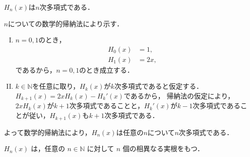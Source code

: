 \begin{proposition}{}{}
    $H_n (x)$は$n$次多項式である．
\end{proposition}

\begin{tproof}
    $n$についての数学的帰納法により示す．
    \begin{enumerate}[(I)]
        \item $n =0, 1$のとき，
              \begin{align*}
                  H_0 (x) & = 1,  \\
                  H_1 (x) & = 2x,
              \end{align*}
              であるから，$n=0, 1 $のとき成立する．
        \item $k \in \mathbb{N}$を任意に取り，$H_k (x)$が$k$次多項式であると仮定する．
              $ H_{k+1}(x) =  2x H_k(x)-H_k'(x)$であるから，
              帰納法の仮定により，$ 2 x H_k (x)$が$k+1$次多項式であることと，$H_k'(x)$が$k-1$次多項式であることが従い，$H_{k+1}(x)$も$k+1$次多項式である．
    \end{enumerate}
    よって数学的帰納法により，$H_n (x)$は任意の$n$について$n$次多項式である．
\end{tproof}

\begin{proposition}{}{}
    $H_n(x)$ は，任意の $n \in \mathbb{N}$ に対して $n$ 個の相異なる実根をもつ．
\end{proposition}

